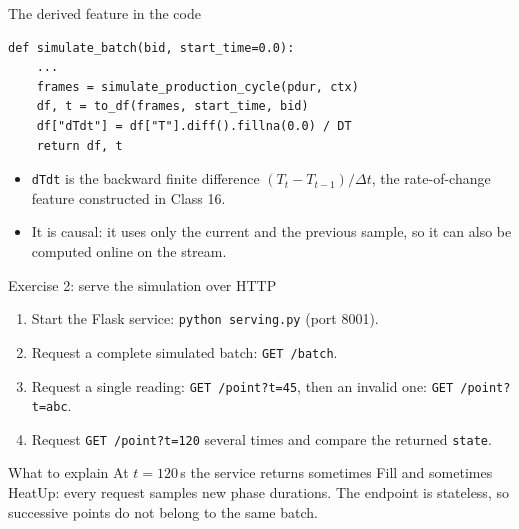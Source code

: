 \begin{frame}[fragile]{The derived feature in the code}
\begin{lstlisting}[style=coursepython]
def simulate_batch(bid, start_time=0.0):
    ...
    frames = simulate_production_cycle(pdur, ctx)
    df, t = to_df(frames, start_time, bid)
    df["dTdt"] = df["T"].diff().fillna(0.0) / DT
    return df, t
\end{lstlisting}
\begin{itemize}
\item \texttt{dTdt} is the backward finite difference $(T_t - T_{t-1})/\Delta t$, the rate-of-change feature constructed in Class 16.
\item It is causal: it uses only the current and the previous sample, so it can also be computed online on the stream.
\end{itemize}
\coursefooter
\end{frame}

\begin{frame}{Exercise 2: serve the simulation over HTTP}
\begin{enumerate}
\item Start the Flask service: \texttt{python serving.py} (port 8001).
\item Request a complete simulated batch: \texttt{GET /batch}.
\item Request a single reading: \texttt{GET /point?t=45}, then an invalid one: \texttt{GET /point?t=abc}.
\item Request \texttt{GET /point?t=120} several times and compare the returned \texttt{state}.
\end{enumerate}
\vspace{0.4em}
\begin{block}{What to explain}
At $t = 120$\,s the service returns sometimes Fill and sometimes HeatUp: every request samples new phase durations. The endpoint is stateless, so successive points do not belong to the same batch.
\end{block}
\coursefooter
\end{frame}

